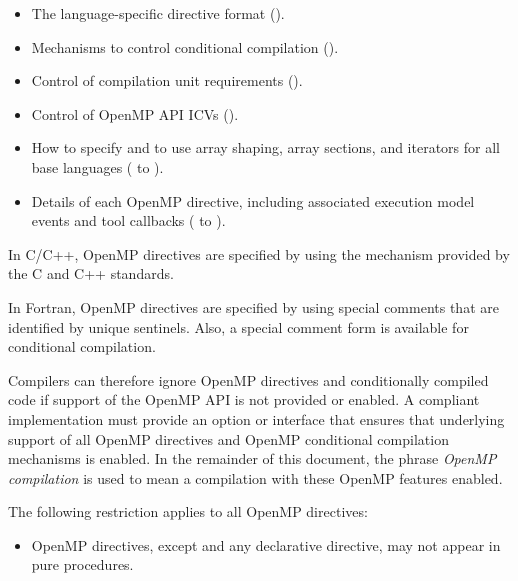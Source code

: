 \begin{itemize}
\item The language-specific directive format
().

\item Mechanisms to control conditional compilation
().

\item Control of compilation unit requirements
().

\item Control of OpenMP API ICVs
().

\item How to specify and to use array shaping, array sections, and iterators for all base languages
( to
).

\item Details of each OpenMP directive, including associated execution model events and tool callbacks
( to
).
\end{itemize}

\begin{ccppspecific}
In C/C++, OpenMP directives are specified by using the  mechanism provided
by the C and C++ standards.
\end{ccppspecific}

\begin{fortranspecific}
In Fortran, OpenMP directives are specified by using special comments that are
identified by unique sentinels. Also, a special comment form is available for conditional
compilation.
\end{fortranspecific}

Compilers can therefore ignore OpenMP directives and conditionally compiled code if
support of the OpenMP API is not provided or enabled. A compliant implementation
must provide an option or interface that ensures that underlying support of all OpenMP
directives and OpenMP conditional compilation mechanisms is enabled. In the
remainder of this document, the phrase \emph{OpenMP compilation} is used to mean a
compilation with these OpenMP features enabled.

\begin{samepage}
\begin{fortranspecific}
\restrictions
The following restriction applies to all OpenMP directives:
\begin{itemize}
  \item OpenMP directives, except  and any declarative directive,
 may not appear in pure procedures.
\end{itemize}
\end{fortranspecific}
\end{samepage}



